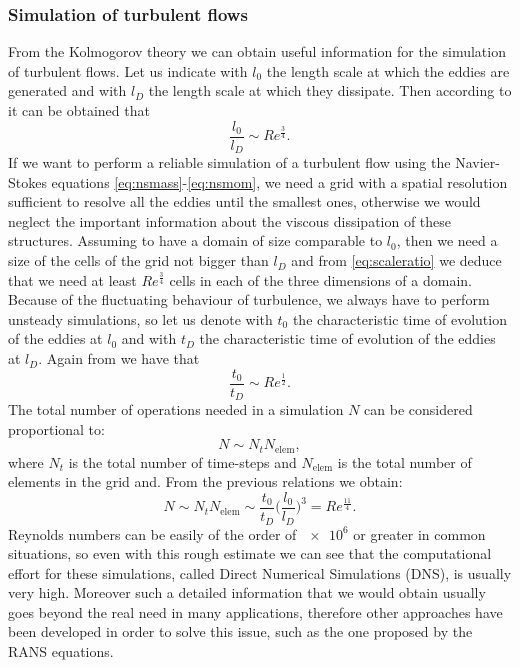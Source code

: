 \subsubsection{Simulation of turbulent flows}
From the Kolmogorov theory we can obtain useful information for the simulation 
of turbulent flows. Let us indicate with $l_0$ the length scale at which the 
eddies are generated and with $l_D$ the length scale at which they dissipate. 
Then according to \cite{turbo:kolmogorov} it can be obtained that
\begin{equation} \label{eq:scaleratio}
	\frac{l_0}{l_D} \sim Re^\frac{3}{4}.
\end{equation}
If we want to perform a reliable simulation of a turbulent flow using the 
Navier-Stokes equations \eqref{eq:nsmass}-\eqref{eq:nsmom}, we need a grid with 
a spatial resolution sufficient to resolve all the eddies until the smallest 
ones, otherwise we would neglect the important information about the viscous 
dissipation of these structures. Assuming to have a domain of size comparable 
to $l_0$, then we need a size of the cells of the grid not bigger than $l_D$ and
from \eqref{eq:scaleratio} we deduce that we need at least $Re^\frac{3}{4}$ 
cells in each of the three dimensions of a domain. Because of the fluctuating 
behaviour of turbulence, we always have to perform unsteady simulations, so let 
us denote with $t_0$ the characteristic time of evolution of the eddies at 
$l_0$ and with $t_D$ the characteristic time of evolution of the eddies at 
$l_D$. Again from \cite{turbo:kolmogorov} we have that
\begin{equation}
\frac{t_0}{t_D} \sim Re^\frac{1}{2}.
\end{equation}
The total number of operations needed in a simulation $N$ can be considered 
proportional to:
\begin{equation}
	N \sim  N_t N_\text{elem},
\end{equation}
where $N_t$ is the total number of time-steps and $N_\text{elem}$ is the total 
number 
of elements in the grid and. From the previous relations we obtain:
\begin{equation}
	N \sim N_t N_\text{elem} \sim \frac{t_0}{t_D} \bigg(\frac{l_0}{l_D}\bigg)^3 
	= Re^\frac{11}{4}.
\end{equation}
Reynolds numbers can be easily of the order of $\num{e6}$ or greater in common 
situations, so even with this rough estimate we can see that the computational 
effort for these simulations, called Direct Numerical Simulations (DNS), is 
usually very high. Moreover such a detailed information that we would obtain 
usually goes beyond the real need in many applications, therefore other 
approaches have been developed in order to solve this issue, such as the one 
proposed by the RANS equations.
%
